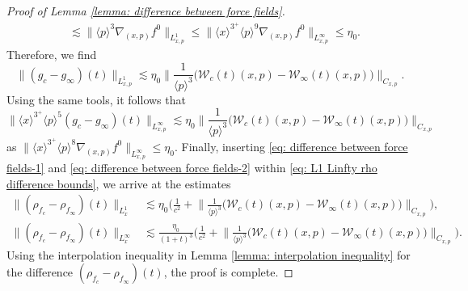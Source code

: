 \documentclass[10pt,a4paper]{amsart}
\begin{document}
\begin{proof}[Proof of Lemma \ref{lemma: difference between force fields}]
$$\begin{aligned}
&\lesssim \big\|\langle p\rangle^3\nabla_{(x,p)}f^0 \big\|_{L_{x,p}^1}
\leq \Big\|\langle x\rangle^{3^+}\langle p \rangle^9\nabla_{(x,p)}f^0\Big\|_{L_{x,p}^\infty} \leq\eta_0.
\end{aligned}$$
Therefore, we find
\begin{equation}\label{eq: difference between force fields-1}
\|(g_c-g_\infty)(t)\|_{L_{x,p}^1}\lesssim \eta_0\Big\|\frac{1}{\langle p\rangle^3}\Big(\mathcal{W}_c(t)(x,p)-\mathcal{W}_\infty(t)(x,p)\Big)\Big\|_{C_{x,p}}.
\end{equation}
Using the same tools, it follows that 
\begin{equation}\label{eq: difference between force fields-2}
\Big\|\langle x\rangle^{3^+}\langle p\rangle^5(g_c-g_\infty)(t)\Big\|_{L^\infty_{x,p}}\lesssim \eta_0\Big\|\frac{1}{\langle p\rangle^3}\Big(\mathcal{W}_c(t)(x,p)-\mathcal{W}_\infty(t)(x,p)\Big)\Big\|_{C_{x,p}}
\end{equation}
as
$\Big\|\langle x\rangle^{3^+}\langle p \rangle^8\nabla_{(x,p)}f^0\Big\|_{L_{x,p}^\infty}\leq \eta_0.$
Finally, inserting \eqref{eq: difference between force fields-1} and \eqref{eq: difference between force fields-2} within \eqref{eq: L1 Linfty rho difference bounds}, we arrive at the estimates
$$
\begin{aligned}
\big\|(\rho_{f_c}-\rho_{f_\infty})(t)\big\|_{L_x^1}&\lesssim
\eta_0 \bigg(\frac{1}{c^2} + \Big\|\frac{1}{\langle p\rangle^3}\Big(\mathcal{W}_c(t)(x,p)-\mathcal{W}_\infty(t)(x,p)\Big)\Big\|_{C_{x,p}} \bigg),\\
\big\|(\rho_{f_c}-\rho_{f_\infty})(t)\big\|_{L_x^\infty}&\lesssim
\frac{\eta_0}{(1+t)^3}\bigg(\frac{1}{c^2} + \Big\|\frac{1}{\langle p\rangle^3}\Big(\mathcal{W}_c(t)(x,p)-\mathcal{W}_\infty(t)(x,p)\Big)\Big\|_{C_{x,p}} \bigg).
\end{aligned}
$$
Using the interpolation inequality in Lemma \ref{lemma: interpolation inequality} for the difference $(\rho_{f_c}-\rho_{f_\infty})(t)$, the proof is complete.
\end{proof}
\end{document}
